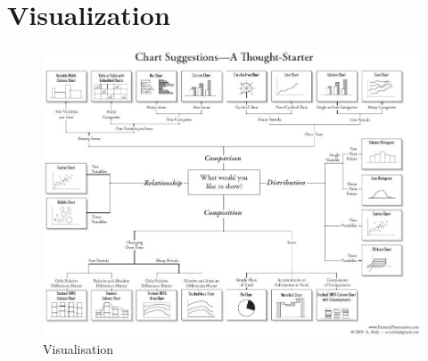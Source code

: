 \section{Visualization}

\begin{figure}
\centering
\includegraphics[width=\textwidth]{images/which-chart-when.jpeg}
\caption{Visualisation}
\end{figure}

